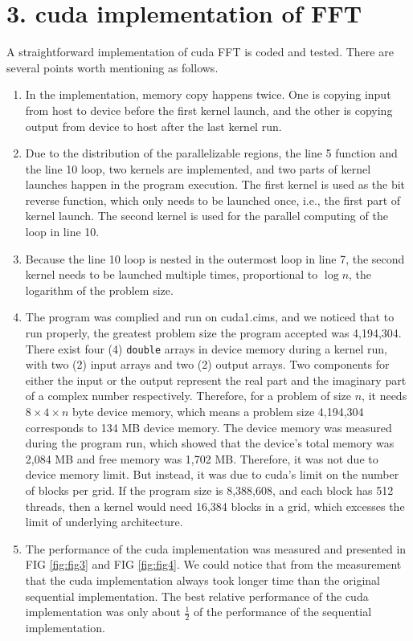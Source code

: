 \documentclass[amsmath,amssymb]{revtex4}
\begin{document}
\section{\label{sec:sec3}3. cuda implementation of FFT}
A straightforward implementation of cuda FFT is coded and tested. There are several points worth mentioning as follows.
\begin{enumerate}
\item In the implementation, memory copy happens twice. One is copying input from host to device before the first kernel launch, and the other is copying output from device to host after the last kernel run.
\item Due to the distribution of the parallelizable regions, the line 5 function and the line 10 loop, two kernels are implemented, and two parts of kernel launches happen in the program execution. The first kernel is used as the bit reverse function, which only needs to be launched once, i.e., the first part of kernel launch. The second kernel is used for the parallel computing of the loop in line 10.
\item Because the line 10 loop is nested in the outermost loop in line 7, the second kernel needs to be launched multiple times, proportional to $\log n$, the logarithm of the problem size. 
\item The program was complied and run on cuda1.cims, and we noticed that to run properly, the greatest problem size the program accepted was 4,194,304. There exist four (4) {\tt double} arrays in device memory during a kernel run, with two (2) input arrays and two (2) output arrays. Two components for either the input or the output represent the real part and the imaginary part of a complex number respectively. Therefore, for a problem of size $n$, it needs $8\times4\times n$ byte device memory, which means a problem size 4,194,304 corresponds to 134 MB device memory. The device memory was measured during the program run, which showed that the device's total memory was 2,084 MB and free memory was 1,702 MB. Therefore, it was not due to device memory limit. But instead, it was due to cuda's limit on the number of blocks per grid. If the program size is 8,388,608, and each block has 512 threads, then a kernel would need 16,384 blocks in a grid, which excesses the limit of underlying architecture.
\item The performance of the cuda implementation was measured and presented in FIG \ref{fig:fig3} and FIG \ref{fig:fig4}. We could notice that from the measurement that the cuda implementation always took longer time than the original sequential implementation. The best relative performance of the cuda implementation was only about $\frac{1}{2}$ of the performance of the sequential implementation.

\end{enumerate}
\end{document}
